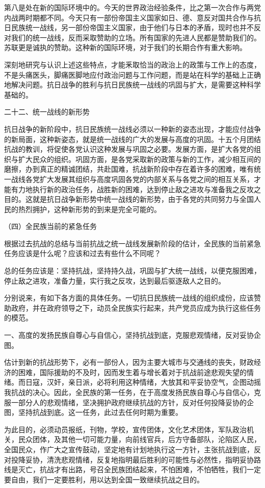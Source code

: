 第八是处在新的国际环境中的。今天的世界政治经验条件，比之第一次合作与两党内战两时期都不同。今天只有一部份帝国主义国家如日、德、意反对国共合作与抗日民族统一战线，另一部份帝国主义国家，由于他们与日本的矛盾，现时也并不反对我们的统一战线，反而采取赞助的立场。所有国家的先进人民都是赞助我们的。苏联更是诚执的赞助。这种新的国际环境，对于我们的长期合作有重大影响。

深刻地研究与认识上述这些特点，才能釆取恰当的政治上的政策与工作上的态度，不是头痛医头，脚痛医脚地应付政治问题与工作问题，而是站在科学的基础上正确地解决问题。抗日战争的胜利与抗日民族统一战线的巩固与扩大，是需要这种科学基础的。

二十二、统一战线的新形势

抗日战争的新阶段中，抗日民族统一战线必须以一种新的姿态出现，才能应付战争的新局面，这种新姿态，就是统一战线的广大的发展与高度的巩固。十五个月团结抗战的教训，将促使各党认识这种发展与巩固之必要。发展方面，是扩大各党的组织与扩大民众的组织。巩固方面，是各党采取新的政策与新的工作，减少相互间的磨擦，办到真正的精诚团结，共赴国难，抗战新阶段中存在着许多的困难，唯有统一战线各党扩大发展其组织与高度巩固各党的内部关系与各党之间的相互关系，才能有力地执行新的政治任务，战胜新的困难，达到停止敌之进攻与准备我之反攻之目的。这就是抗日战争新形势中统一战线的新形势，由于各党的共同努力与全国人民的热烈拥护，这种新形势的到来是完全可能的。

（四）全民族当前的紧急任务

根据过去抗战的总结与当前抗战之统一战线发展新阶段的估计，全民族的当前紧急任务应该是什么呢？应该和过去有些什么不同呢？

总的任务应该是：坚持抗战，坚持持久战，巩固与扩大统一战线，以便克服困难，停止敌之进攻，准备力量，实行我之反攻，达到最后驱逐敌人之目的。

分别说来，有如下各方面的具体任务。一切抗日民族统一战线的组织成份，应该赞助政府，并在政府领导之下，动员全民族实行起来，共产党员应成为执行这些任务的模范。

一、高度的发扬民族自尊心与自信心，坚持抗战到底，克服悲观情绪，反对妥协企图。

估计到新的抗战形势下，必有一部份人，因为主要大城市与交通线的丧失，财政经济的困难，国际援助的不及时，因而发生着与增长着对于抗战前途悲观失望的情绪。而日寇，汉奸，亲日派，必将利用这种情绪，大放其和平妥协空气，企图动摇我抗战的决心。因此，全民族的第一任务，在于高度发扬民族自尊心与自信心，克服一部分人的悲观情绪，坚决拥护政府继续抗战的方针，反对任何投降妥协的企图，坚持抗战到底。这一任务，此过去任何时期为重要。

为此目的，必须动员报纸，刊物，学校，宣传团体，文化艺术团体，军队政治机关，民众团体，及其他一切可能力量，向前线官兵，后方守备部队，沦陷区人民，全国民众，作广大之宣传鼓动，坚定地有计划地执行这一方针，主张抗战到底，反对投降妥协，清洗悲观情绪，反复地指明最后胜利的可能性与必然性，指明妥协路线是灭亡，抗战才有出路，号召全民族团结起来，不怕困难，不怕牺牲，我们一定要自由，我们一定要胜利，用以达到全国一致继续抗战之目的。

